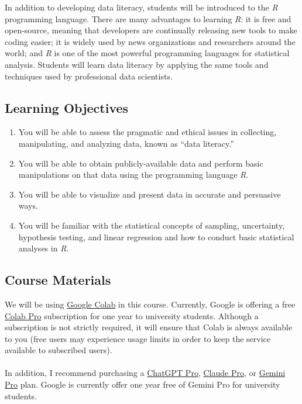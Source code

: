\documentclass[12pt,letterpaper]{article}
\begin{document}
In addition to developing data literacy, students will be introduced
to the \textit{R} programming language. There are many advantages to
learning \textit{R}: it is free and open-source, meaning that
developers are continually releasing new tools to make coding easier;
it is widely used by news organizations and researchers around the
world; and \textit{R} is one of the most powerful programming
languages for statistical analysis. Students will learn data literacy
by applying the same tools and techniques used by professional data scientists.

\subsection*{Learning Objectives}

\begin{enumerate}
  \item You will be able to assess the pragmatic and ethical issues
    in collecting, manipulating, and analyzing data, known as ``data literacy.''
  \item You will be able to obtain publicly-available data and
    perform basic manipulations on that data using the programming
    language \textit{R}.
  \item You will be able to visualize and present data in accurate
    and persuasive ways.
  \item You will be familiar with the statistical concepts of
    sampling, uncertainty, hypothesis testing, and linear regression
    and how to conduct basic statistical analyses in \textit{R}.
\end{enumerate}
\vspace{-.5em}

\subsection*{Course Materials}

We will be using \href{https://colab.research.google.com/}{Google
Colab} in this course. Currently, Google is offering a free
\href{https://colab.research.google.com/signup}{Colab Pro}
subscription for one year to university students. Although a
subscription is not strictly required, it will ensure that Colab is
always available to you (free users may experience usage limits in
order to keep the service available to subscribed users).\\
\\
In addition, I recommend purchasing a
\href{https://chatgpt.com/plans/plus/}{ChatGPT Pro},
\href{https://claude.com/pricing}{Claude Pro}, or
\href{https://gemini.google/students/}{Gemini Pro} plan. Google is
currently offer one year free of Gemini Pro for university students.
\end{document}
